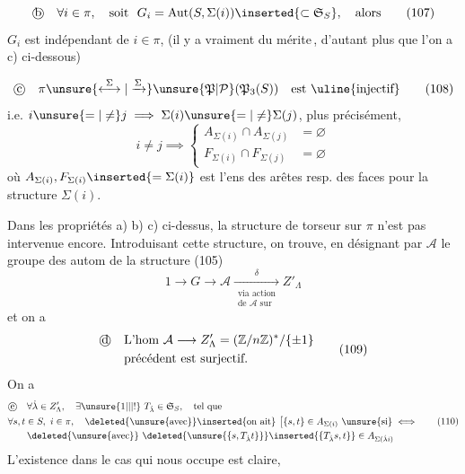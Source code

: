 
\[
\text{\textcircled{b}}\quad \forall i\in\pi,\quad\text{soit }\ G_i=\mathrm{Aut}(S,\Sigma(i))\inserted{\subset\mathfrak S_S},\quad\text{alors}\tag*{(107)}
\]
$G_i$ est indépendant de $i\in\pi$,  (il y a vraiment du mérite\,, d'autant plus que l'on a c) ci-dessous)

\[
\text{\textcircled{c}}\quad \pi\unsure{\overset{\Sigma}{\longleftrightarrow}|\xrightarrow{\Sigma}}\unsure{\mathfrak P|\mathcal P}(\mathfrak P_3(S))\quad\text{est \uline{injectif}}\tag*{(108)}
\]
i.e. $i\unsure{=|\ne}j\implies\Sigma(i)\unsure{=|\ne}\Sigma(j)$, plus précisément,
\[
i\ne j\implies\left\{\begin{aligned}
A_{\Sigma(i)}\cap A_{\Sigma(j)}&=\varnothing\\
F_{\Sigma(i)}\cap F_{\Sigma(j)}&=\varnothing
\end{aligned}\right.
\]
où $A_{\Sigma(i)},F_{\Sigma(i)}\inserted{=\Sigma(i)}$ est l'ens des arêtes resp. des faces pour  la structure $\Sigma(i)$.

Dans les propriétés a) b) c) ci-dessus, la structure de torseur sur $\pi$ n'est pas intervenue encore. Introduisant cette structure, on trouve, en désignant par $\mathcal A$ le groupe des autom de la structure (105)
\[
1\longrightarrow G\longrightarrow\mathcal A
\xrightarrow[\substack{\text{via action}\\\text{de }\mathcal A\text{ sur}}]{\delta}Z'_\Lambda
\]
et on a
\[
\begin{aligned}
&\text{\textcircled{d}}\quad\text{L'hom }\mathcal A\longrightarrow Z'_\Lambda=(\mathbb Z/n\mathbb Z)^*/\{\pm1\}\\
&\qquad\text{précédent est surjectif.}
\end{aligned}\tag*{(109)}
\]
On a
\[
\begin{aligned}
&\text{\textcircled{e}}\quad\forall\dot\lambda\in Z'_\Lambda,\quad\exists\unsure{1|\vert|!}\ T_{\dot\lambda}\in\mathfrak S_S,\quad\text{tel que}\\
&\forall s,t\in S,\ i\in\pi,\quad\deleted{\text{\unsure{avec}}}\inserted{\text{on ait}}\ 
\bigl[\{s,t\}\in A_{\Sigma(i)}\ \text{\unsure{si}}\iff\\
&\qquad\deleted{\text{\unsure{avec}}}\ \deleted{\unsure{\{s,T_{\dot\lambda}t\}}}\inserted{\{T_{\dot\lambda}s,t\}}\in A_{\Sigma(\dot\lambda i)}
\end{aligned}\tag*{(110)}
\]
L'existence dans le cas qui nous occupe est claire,
